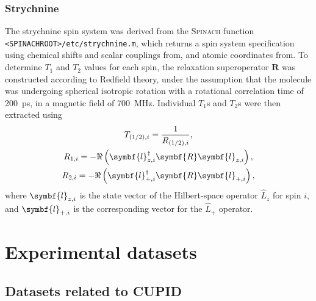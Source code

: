 \subsubsection{Strychnine}
The strychnine spin system was derived from
the \textsc{Spinach} function \texttt{<SPINACHROOT>/etc/strychnine.m}, which returns a
spin system specification using chemical shifts and scalar couplings
from\cite[Appendix 5]{Berger2004}, and atomic coordinates
from\cite[Supplementary Material]{Butts2011}. To determine $T_1$ and  $T_2$
values for each spin, the relaxation superoperator $\symbf{R}$ was
constructed according to Redfield theory, under the assumption
that the molecule was undergoing spherical isotropic rotation with a rotational
correlation time of \qty{200}{\pico\second}, in a magnetic field of
\qty{700}{\mega\hertz}. Individual $T_1$s and $T_2$s were then extracted using
\begin{subequations}
    \begin{gather}
        T_{(1/2),i} = \frac{1}{R_{(1/2),i}}, \\
        R_{1,i} = - \Re \left(
            \symbf{l}_{z,i}^{\dagger} \symbf{R} \symbf{l}_{z,i}^{\vphantom{\dagger}}
            \right),\\
        R_{2,i} = - \Re \left(
            \symbf{l}_{+,i}^{\dagger} \symbf{R} \symbf{l}_{+,i}^{\vphantom{\dagger}}
            \right),
    \end{gather}
\end{subequations}
where $\symbf{l}_{z,i}^{\vphantom{\dagger}}$ is the state vector of the
Hilbert-space operator $\hat{L}_z$ for spin $i$, and
$\symbf{l}_{+,i}^{\vphantom{\dagger}}$ is the corresponding vector for the
$\hat{L}_+$ operator.




\section{Experimental datasets}

\subsection{Datasets related to \ac{CUPID}}

